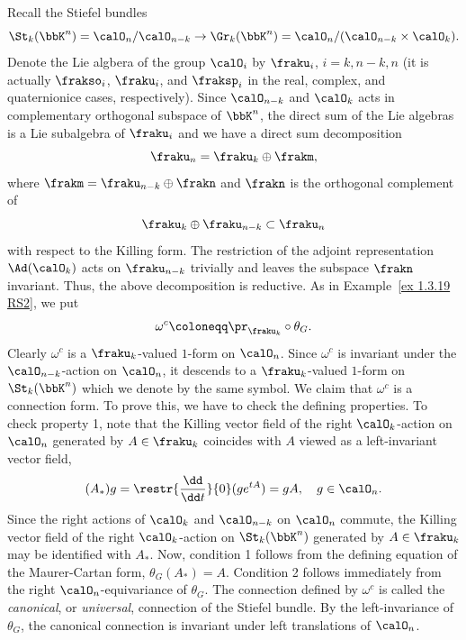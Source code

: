 \begin{example}
    Recall the Stiefel bundles
    \[\St_k(\bbK^n)=\calO_n\slash \calO_{n-k}\to \Gr_k(\bbK^n)=\calO_n\slash (\calO_{n-k}\times\calO_k).\]
    Denote the Lie algbera of the group $\calO_i$ by $\fraku_i$, $i=k,n-k,n$ (it is actually $\frakso_i$, $\fraku_i$, and $\fraksp_i$ in the real, complex, and quaternionice cases, respectively). Since $\calO_{n-k}$ and $\calO_k$ acts in complementary orthogonal subspace of $\bbK^n$, the direct sum of the Lie algebras is a Lie subalgebra of $\fraku_i$ and we have a direct sum decomposition
    \[\fraku_n=\fraku_k\oplus\frakm,\]
    where $\frakm=\fraku_{n-k}\oplus\frakn$ and $\frakn$ is the orthogonal complement of
    \[\fraku_k\oplus\fraku_{n-k}\subset \fraku_n\]
    with respect to the Killing form. The restriction of the adjoint representation $\Ad(\calO_k)$ acts on $\fraku_{n-k}$ trivially and leaves the subspace $\frakn$ invariant. Thus, the above decomposition is reductive. As in Example~\ref{ex 1.3.19 RS2}, we put
    \[\omega^c\coloneqq \pr_{\fraku_k}\circ\theta_G.\]
    Clearly $\omega^c$ is a $\fraku_k$-valued $1$-form on $\calO_n$. Since $\omega^c$ is invariant under the $\calO_{n-k}$-action on $\calO_n$, it descends to a $\fraku_k$-valued $1$-form on $\St_k(\bbK^n)$ which we denote by the same symbol. We claim that $\omega^c$ is a connection form. To prove this, we have to check the defining properties. To check property 1, note that the Killing vector field of the right $\calO_k$-action on $\calO_n$ generated by $A\in \fraku_k$ coincides with $A$ viewed as a left-invariant vector field,
    \[(A_\ast)g=\restr{\frac{\dd}{\dd t}}{0}(g e^{tA})=gA,\quad g\in\calO_n.\]
    Since the right actions of $\calO_k$ and $\calO_{n-k}$ on $\calO_n$ commute, the Killing vector field of the right $\calO_k$-action on $\St_k(\bbK^n)$ generated by $A\in\fraku_k$ may be identified with $A_\ast$. Now, condition 1 follows from the defining equation of the Maurer-Cartan form, $\theta_G(A_\ast)=A$. Condition 2 follows immediately from the right $\calO_n$-equivariance of $\theta_G$. The connection defined by $\omega^c$ is called the \emph{canonical}, or \emph{universal}, connection of the Stiefel bundle. By the left-invariance of $\theta_G$, the canonical connection is invariant under left translations of $\calO_n$.


\end{example}
